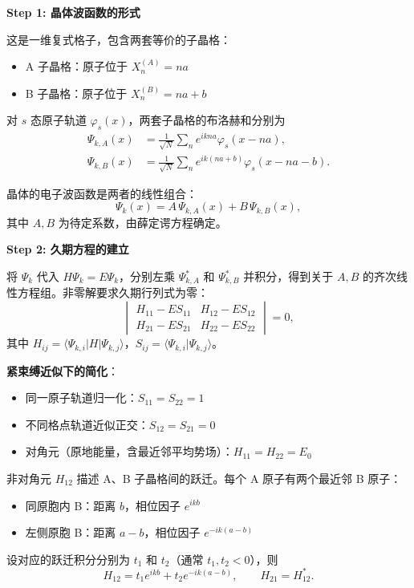\begin{derivationbox}[标准解题过程]
\textbf{Step 1: 晶体波函数的形式}

这是一维复式格子，包含两套等价的子晶格：
\begin{itemize}
    \item A 子晶格：原子位于 $X_n^{(A)}=na$
    \item B 子晶格：原子位于 $X_n^{(B)}=na+b$
\end{itemize}

对 $s$ 态原子轨道 $\varphi_s(x)$，两套子晶格的布洛赫和分别为
\begin{align}
\Psi_{k,A}(x) &= \frac{1}{\sqrt{N}}\sum_{n}e^{ikna}\varphi_s(x-na),\\
\Psi_{k,B}(x) &= \frac{1}{\sqrt{N}}\sum_{n}e^{ik(na+b)}\varphi_s(x-na-b).
\end{align}

晶体的电子波函数是两者的线性组合：
\begin{equation}
\boxed{\Psi_k(x) = A\,\Psi_{k,A}(x) + B\,\Psi_{k,B}(x),}
\end{equation}
其中 $A,B$ 为待定系数，由薛定谔方程确定。

\textbf{Step 2: 久期方程的建立}

将 $\Psi_k$ 代入 $H\Psi_k=E\Psi_k$，分别左乘 $\Psi_{k,A}^*$ 和 $\Psi_{k,B}^*$ 并积分，得到关于 $A,B$ 的齐次线性方程组。非零解要求久期行列式为零：
\begin{equation}
\begin{vmatrix}
H_{11}-ES_{11} & H_{12}-ES_{12} \\[4pt]
H_{21}-ES_{21} & H_{22}-ES_{22}
\end{vmatrix}=0,
\end{equation}
其中 $H_{ij}=\langle\Psi_{k,i}|H|\Psi_{k,j}\rangle$，$S_{ij}=\langle\Psi_{k,i}|\Psi_{k,j}\rangle$。

\textbf{紧束缚近似下的简化}：
\begin{itemize}
    \item 同一原子轨道归一化：$S_{11}=S_{22}=1$
    \item 不同格点轨道近似正交：$S_{12}=S_{21}=0$
    \item 对角元（原地能量，含最近邻平均势场）：$H_{11}=H_{22}=E_0$
\end{itemize}

非对角元 $H_{12}$ 描述 A、B 子晶格间的跃迁。每个 A 原子有两个最近邻 B 原子：
\begin{itemize}
    \item 同原胞内 B：距离 $b$，相位因子 $e^{ikb}$
    \item 左侧原胞 B：距离 $a-b$，相位因子 $e^{-ik(a-b)}$
\end{itemize}
设对应的跃迁积分分别为 $t_1$ 和 $t_2$（通常 $t_1,t_2<0$），则
\begin{equation}
H_{12}=t_1 e^{ikb}+t_2 e^{-ik(a-b)},\qquad H_{21}=H_{12}^*.
\end{equation}


\end{derivationbox}
